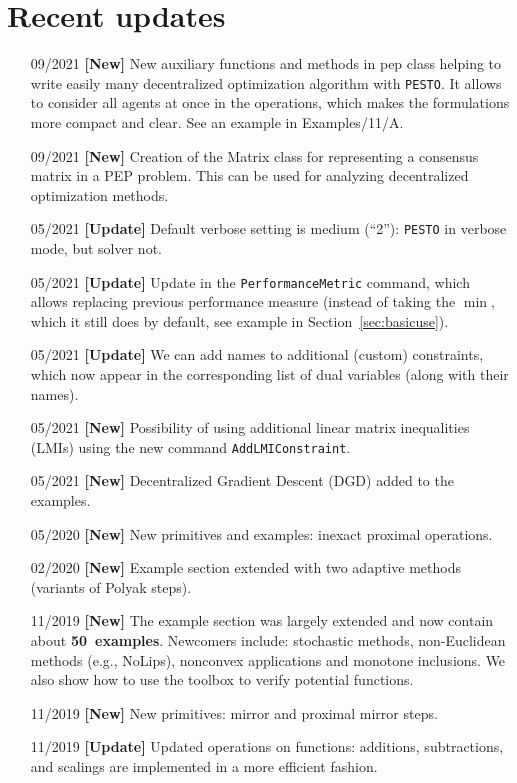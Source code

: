 \documentclass[11pt,a4paper]{article}
\begin{document}
	\section*{Recent updates}
	\begin{itemize}
		\item[09/2021] {\bf{}[New]} New auxiliary functions and methods in pep class helping to write easily many decentralized optimization algorithm with \verb|PESTO|. It allows to consider all agents at once in the operations, which makes the formulations more compact and clear. See an example in Examples/11/A.
		\item[09/2021] {\bf{}[New]} Creation of the Matrix class for representing a consensus matrix in a PEP problem. This can be used for analyzing decentralized optimization methods.
		\item[05/2021] {\bf{}[Update]} Default verbose setting is medium (``2''): \verb|PESTO| in verbose mode, but solver not.
		\item[05/2021] {\bf{}[Update]} Update in the \verb|PerformanceMetric| command, which allows replacing previous performance measure (instead of taking the $\min$, which it still does by default, see example in Section~\ref{sec:basicuse}).
		\item[05/2021] {\bf{}[Update]} We can add names to additional (custom) constraints, which now appear in the corresponding list of dual variables (along with their names).
		\item[05/2021] {\bf{}[New]} Possibility of using additional linear matrix inequalities (LMIs) using the new command \verb?AddLMIConstraint?.
		\item[05/2021] {\bf{}[New]} Decentralized Gradient Descent (DGD) added to the examples.
		\item[05/2020] {\bf{}[New]} New primitives and examples: inexact proximal operations.
		\item[02/2020] {\bf{}[New]} Example section extended with two adaptive methods (variants of Polyak steps).
		\item[11/2019] {\bf{}[New]} The example section was largely extended and now contain about {\bf 50~examples}. Newcomers include:  stochastic methods, non-Euclidean methods (e.g., NoLips), nonconvex applications and monotone inclusions. We also show how to use the toolbox to verify potential functions.
		\item[11/2019] {\bf{}[New]} New primitives: mirror and proximal mirror steps.
		\item[11/2019] {\bf{}[Update]} Updated operations on functions: additions, subtractions, and scalings are implemented in a more efficient fashion.

\end{itemize}
\end{document}
